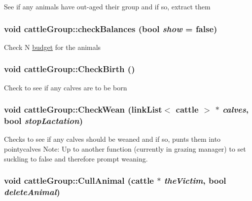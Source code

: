 \label{classcattle_group_ab90b18a82f05308c895fd72e5d5447c4}
See if any animals have out-\/aged their group and if so, extract them \hypertarget{classcattle_group_a727a18c5ed01a68ab343ec6688f618aa}{
\subsubsection[{checkBalances}]{\setlength{\rightskip}{0pt plus 5cm}void cattleGroup::checkBalances (bool {\em show} = {\ttfamily false})}}
\label{classcattle_group_a727a18c5ed01a68ab343ec6688f618aa}
Check N \hyperlink{classbudget}{budget} for the animals \hypertarget{classcattle_group_a8b9c6a787edfd3af498b2637d7447f50}{
\subsubsection[{CheckBirth}]{\setlength{\rightskip}{0pt plus 5cm}void cattleGroup::CheckBirth ()}}
\label{classcattle_group_a8b9c6a787edfd3af498b2637d7447f50}
Check to see if any calves are to be born \hypertarget{classcattle_group_a9ed58662cb74b50fb0cd4bc4ebd4864a}{
\subsubsection[{CheckWean}]{\setlength{\rightskip}{0pt plus 5cm}void cattleGroup::CheckWean ({\bf linkList}$<$ {\bf cattle} $>$ $\ast$ {\em calves}, \/  bool {\em stopLactation})}}
\label{classcattle_group_a9ed58662cb74b50fb0cd4bc4ebd4864a}
Checks to see if any calves should be weaned and if so, punts them into pointycalves Note: Up to another function (currently in grazing manager) to set suckling to false and therefore prompt weaning. \hypertarget{classcattle_group_aac8d50c5b32a65a1afd0ff10ea12503e}{
\subsubsection[{CullAnimal}]{\setlength{\rightskip}{0pt plus 5cm}void cattleGroup::CullAnimal ({\bf cattle} $\ast$ {\em theVictim}, \/  bool {\em deleteAnimal})}}
\label{classcattle_group_aac8d50c5b32a65a1afd0ff10ea12503e}
